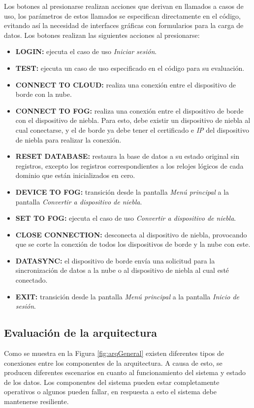 Los botones al presionarse realizan acciones que derivan en llamados a casos de uso, los parámetros de estos llamados se especifican directamente en el código, evitando así la necesidad de interfaces gráficas con formularios para la carga de datos. Los botones realizan las siguientes acciones al presionarse:
\begin{itemize}
    \item \textbf{LOGIN: }ejecuta el caso de uso \textit{Iniciar sesión}.
    \item \textbf{TEST: }ejecuta un caso de uso especificado en el código para su evaluación.
    \item \textbf{CONNECT TO CLOUD: }realiza una conexión entre el dispositivo de borde con la nube.
    \item \textbf{CONNECT TO FOG: }realiza una conexión entre el dispositivo de borde con el dispositivo de niebla. Para esto, debe existir un dispositivo de niebla al cual conectarse, y el de borde ya debe tener el certificado e \textit{IP} del dispositivo de niebla para realizar la conexión.
    \item \textbf{RESET DATABASE: }restaura la base de datos a su estado original sin registros, excepto los registros correspondientes a los relojes lógicos de cada dominio que están inicializados en cero.
    \item \textbf{DEVICE TO FOG:} transición desde la pantalla \textit{Menú principal} a la pantalla  \textit{Convertir a dispositivo de niebla}.
    \item \textbf{SET TO FOG: }ejecuta el caso de uso \textit{Convertir a dispositivo de niebla}.
    \item \textbf{CLOSE CONNECTION: }desconecta al dispositivo de niebla, provocando que se corte la conexión de todos los dispositivos de borde y la nube con este.
    \item \textbf{DATASYNC: }el dispositivo de borde envía una solicitud para la sincronización de datos a la nube o al dispositivo de niebla al cual esté conectado.
    \item \textbf{EXIT: }transición desde la pantalla \textit{Menú principal} a la pantalla  \textit{Inicio de sesión}.
\end{itemize}


\subsection{Evaluación de la arquitectura}
Como se muestra en la Figura \ref{fig:arqGeneral} existen diferentes tipos de conexiones entre los componentes de la arquitectura. A causa de esto, se producen diferentes escenarios en cuanto al funcionamiento del sistema y estado de los datos. Los componentes del sistema pueden estar completamente operativos o algunos pueden fallar, en respuesta a esto el sistema debe mantenerse resiliente.

